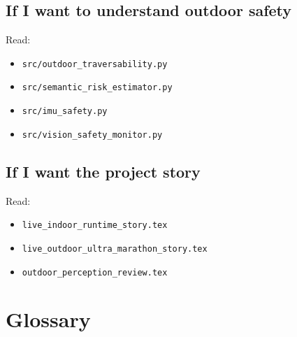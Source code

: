 \documentclass[11pt]{article}
\begin{document}
\subsection*{If I want to understand outdoor safety}

Read:

\begin{itemize}[nosep]
  \item \texttt{src/outdoor\_traversability.py}
  \item \texttt{src/semantic\_risk\_estimator.py}
  \item \texttt{src/imu\_safety.py}
  \item \texttt{src/vision\_safety\_monitor.py}
\end{itemize}

\subsection*{If I want the project story}

Read:

\begin{itemize}[nosep]
  \item \texttt{live\_indoor\_runtime\_story.tex}
  \item \texttt{live\_outdoor\_ultra\_marathon\_story.tex}
  \item \texttt{outdoor\_perception\_review.tex}
\end{itemize}

\section{Glossary}
\end{document}
